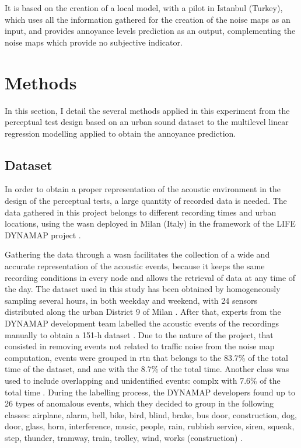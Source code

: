    It is based on the creation of a local model, with a pilot in Istanbul (Turkey), which uses all the information gathered for the creation of the noise maps as an input, and provides annoyance levels prediction as an output, complementing the noise maps which provide no subjective indicator.

\section{Methods}

 In this section, I detail the several methods applied in this experiment from the perceptual test design based on an urban sound dataset  to the multilevel linear regression modelling applied to obtain the annoyance prediction.

 \subsection{Dataset}
   In order to obtain a proper representation of the acoustic environment in the design of the perceptual tests, a large quantity of recorded data is needed. The data gathered in this project belongs to different recording times and urban locations, using the \gls{wasn} deployed in Milan (Italy) in the framework of the LIFE DYNAMAP project .

   Gathering the data through a \gls{wasn} facilitates the collection of a wide and accurate representation of the acoustic events, because it keeps the same recording conditions in every node and allows the retrieval of data at any time of the day. The dataset used in this study has been obtained by homogeneously sampling several hours, in both weekday and weekend, with 24 sensors distributed along the urban District 9 of Milan . After that, experts from the DYNAMAP development team labelled the acoustic events of the recordings manually to obtain a 151-h dataset . Due to the nature of the project, that consisted in removing events not related to traffic noise from the noise map computation, events were grouped in \gls{rtn} that belongs to the 83.7\% of the total time of the dataset, and \gls{ane} with the 8.7\% of the total time. Another class was used to include overlapping and unidentified events: \gls{complx} with 7.6\% of the total time . During the labelling process, the DYNAMAP developers found up to 26 types of anomalous events, which they decided to group in the following classes: airplane, alarm, bell, bike, bird, blind, brake, bus door, construction, dog, door, glass, horn, interference, music, people, rain, rubbish service, siren, squeak, step, thunder, tramway, train, trolley, wind, works (construction) .

